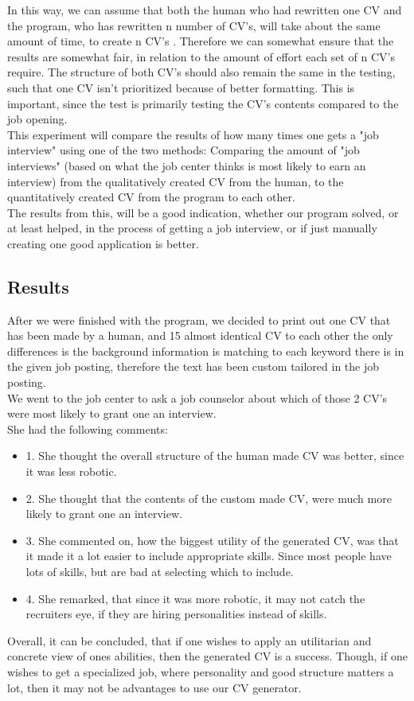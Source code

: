 In this way, we can assume that both the human who had rewritten one
CV and the program, who has rewritten n number of CV's,
will take about the same amount of time, to create n CV's .
Therefore we can somewhat ensure that the results are somewhat fair, in relation to the amount of effort each set of n CV's require.
The structure of both CV's should also remain the same in the testing, such that one CV isn't prioritized because of better formatting.
This is important, since the test is primarily testing the CV's contents compared to the job opening. \\

This experiment will compare the results of how many times one gets a "job
interview" using one of the two methods: Comparing the amount of 
"job interviews" (based on what the job center thinks is most likely to earn an interview) 
from the qualitatively created CV from
the human, to the quantitatively created CV from the program to
each other. \\

The results from this, will be a good indication, whether our program solved, or
at least helped, in the process of getting a job interview, or if just manually
creating one good application is better.

\subsection{Results}
After we were finished with the program, we decided to print out one CV that has been made by a human,
and 15 almost identical CV to each other the only differences is 
the background information is matching to each keyword there is in the given job posting, 
therefore the text has been custom tailored in the job posting. \\

We went to the job center to ask a job counselor about which of those 2 CV's were most likely to grant one an interview. \\

She had the following comments:
\begin{itemize}
  \item 1. She thought the overall structure of the human made CV was better, since it was less robotic.
  \item 2. She thought that the contents of the custom made CV, were much more likely to grant one an interview.
  \item 3. She commented on, how the biggest utility of the generated CV, was that it made it a lot easier to include appropriate skills. Since most people have lots of skills, but are bad at selecting which to include.
  \item 4. She remarked, that since it was more robotic, it may not catch the recruiters eye, if they are hiring personalities instead of skills.
\end{itemize}

Overall, it can be concluded, that if one wishes to apply an utilitarian and concrete view of ones abilities, then the generated CV is a success.
Though, if one wishes to get a specialized job, where personality and good structure matters a lot, then it may not be advantages to use our CV generator.

\clearpage